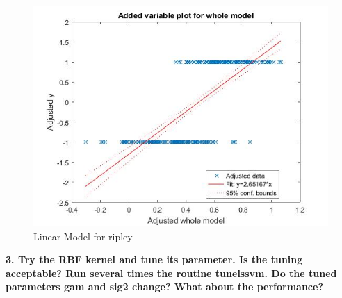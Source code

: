 \documentclass[11pt,oneside,a4paper]{article}
\begin{document}
\begin{figure}[H]
	\centering
	\includegraphics[scale=0.4]{../Figures/ripley_linear}
	\caption{Linear Model for ripley }
\end{figure}

\textbf{3. Try the RBF kernel and tune its parameter. Is the tuning acceptable? Run several times the routine tunelssvm. Do the tuned parameters gam and sig2 change? What about the performance?}\\
\end{document}
